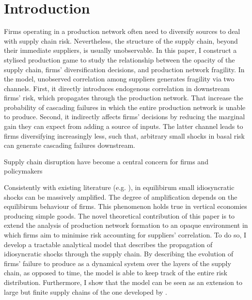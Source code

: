\documentclass[../../main.tex]{subfiles}
\begin{document}
\section{Introduction}

\iffalse
\notes{
  \begin{enumerate}
    \item Research question
    \item Contribution to the literature
    \item Why do we care?
  \end{enumerate}
}
\fi

Firms operating in a production network often need to diversify sources to deal with supply chain risk. Nevertheless, the structure of the supply chain, beyond their immediate suppliers, is usually unobservable. In this paper, I construct a stylised production game to study the relationship between the opacity of the supply chain, firms' diversification decisions, and production network fragility. In the model, unobserved correlation among suppliers generates fragility via two channels. First, it directly introduces endogenous correlation in downstream firms' risk, which propagates through the production network. That increase the probability of cascading failures in which the entire production network is unable to produce. Second, it indirectly affects firms' decisions by reducing the marginal gain they can expect from adding a source of inputs. The latter channel leads to firms diversifying increasingly less, such that, arbitrary small shocks in basal risk can generate cascading failures downstream. 

Supply chain disruption have become a central concern for firms and policymakers  

Consistently with existing literature (e.g. \cite{elliott_supply_2022,kopytov_endogenous_2021}), in equilibirum small idiosyncratic shocks can be massively amplified. The degree of amplification depends on the equilibirum behaviour of firms. This phenomenon holds true in vertical economies producing simple goods. The novel theoretical contribution of this paper is to extend the analysis of production network formation to an opaque environment in which firms aim to minimise risk accounting for suppliers' correlation. To do so, I develop a tractable analytical model that describes the propagation of idiosyncratic shocks through the supply chain. By describing the evolution of firms' failure to produce as a dynamical system over the layers of the supply chain, as opposed to time, the model is able to keep track of the entire risk distribution. Furthermore, I show that the model can be seen as an extension to large but finite supply chains of the one developed by .
\end{document}

